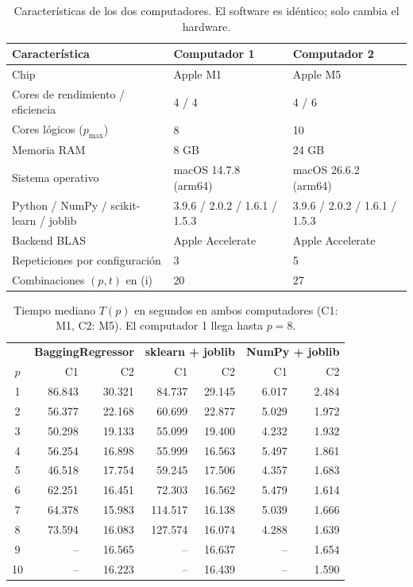 
\begin{table}[h]
    \centering
    \small
    \begin{tabular}{|l|l|l|}
    \hline
    \textbf{Característica} & \textbf{Computador 1} & \textbf{Computador 2} \\
    \hline
    Chip & Apple M1 & Apple M5 \\
    Cores de rendimiento / eficiencia & 4 / 4 & 4 / 6 \\
    Cores lógicos ($p_{\max}$) & 8 & 10 \\
    Memoria RAM & 8 GB & 24 GB \\
    Sistema operativo & macOS 14.7.8 (arm64) & macOS 26.6.2 (arm64) \\
    Python / NumPy / scikit-learn / joblib & 3.9.6 / 2.0.2 / 1.6.1 / 1.5.3 & 3.9.6 / 2.0.2 / 1.6.1 / 1.5.3 \\
    Backend BLAS & Apple Accelerate & Apple Accelerate \\
    Repeticiones por configuración & 3 & 5 \\
    Combinaciones $(p,t)$ en (i) & 20 & 27 \\
    \hline
    \end{tabular}
    \caption{Características de los dos computadores. El software es idéntico; solo cambia el hardware.}
    \label{tab:hardware-j}
\end{table}

\begin{table}[h]
    \centering
    \scriptsize
    \begin{tabular}{|c|rr|rr|rr|}
    \hline
     & \multicolumn{2}{c|}{\textbf{BaggingRegressor}} & \multicolumn{2}{c|}{\textbf{sklearn + joblib}} & \multicolumn{2}{c|}{\textbf{NumPy + joblib}} \\
    $p$ & C1 & C2 & C1 & C2 & C1 & C2 \\
    \hline
    1 & 86.843 & 30.321 & 84.737 & 29.145 & 6.017 & 2.484 \\
    2 & 56.377 & 22.168 & 60.699 & 22.877 & 5.029 & 1.972 \\
    3 & 50.298 & 19.133 & 55.099 & 19.400 & 4.232 & 1.932 \\
    4 & 56.254 & 16.898 & 55.999 & 16.563 & 5.497 & 1.861 \\
    5 & 46.518 & 17.754 & 59.245 & 17.506 & 4.357 & 1.683 \\
    6 & 62.251 & 16.451 & 72.303 & 16.562 & 5.479 & 1.614 \\
    7 & 64.378 & 15.983 & 114.517 & 16.138 & 5.039 & 1.666 \\
    8 & 73.594 & 16.083 & 127.574 & 16.074 & 4.288 & 1.639 \\
    9 & -- & 16.565 & -- & 16.637 & -- & 1.654 \\
    10 & -- & 16.223 & -- & 16.439 & -- & 1.590 \\
    \hline
    \end{tabular}
    \caption{Tiempo mediano $T(p)$ en segundos en ambos computadores (C1: M1, C2: M5). El computador 1 llega hasta $p=8$.}
    \label{tab:tiempos-j}
\end{table}

